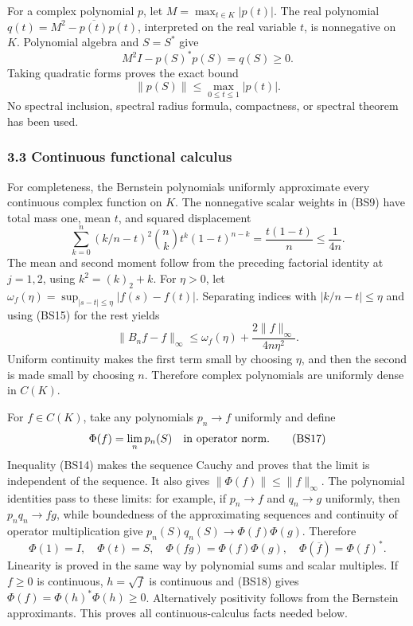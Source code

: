 \documentclass[
  11pt,
]{article}
\begin{document}
For a complex polynomial \(p\), let \(M=\max_{t\in K}|p(t)|\). The real
polynomial \(q(t)=M^2-\overline{p(t)}p(t)\), interpreted on the real
variable \(t\), is nonnegative on \(K\). Polynomial algebra and
\(S=S^*\) give \[
 M^2I-p(S)^*p(S)=q(S)\geq0.
\] Taking quadratic forms proves the exact bound \[
 \|p(S)\|\leq\max_{0\leq t\leq1}|p(t)|.
 \tag{BS14}
\] No spectral inclusion, spectral radius formula, compactness, or
spectral theorem has been used.

\subsubsection{3.3 Continuous functional
calculus}\label{continuous-functional-calculus}

For completeness, the Bernstein polynomials uniformly approximate every
continuous complex function on \(K\). The nonnegative scalar weights in
(BS9) have total mass one, mean \(t\), and squared displacement \[
 \sum_{k=0}^n(k/n-t)^2\binom nk t^k(1-t)^{n-k}
 =\frac{t(1-t)}n\leq\frac1{4n}.
 \tag{BS15}
\] The mean and second moment follow from the preceding factorial
identity at \(j=1,2\), using \(k^2=(k)_2+k\). For \(\eta>0\), let
\(\omega_f(\eta)=\sup_{|s-t|\leq\eta}|f(s)-f(t)|\). Separating indices
with \(|k/n-t|\leq\eta\) and using (BS15) for the rest yields \[
 \|B_nf-f\|_\infty
 \leq\omega_f(\eta)+\frac{2\|f\|_\infty}{4n\eta^2}.
 \tag{BS16}
\] Uniform continuity makes the first term small by choosing \(\eta\),
and then the second is made small by choosing \(n\). Therefore complex
polynomials are uniformly dense in \(C(K)\).

For \(f\in C(K)\), take any polynomials \(p_n\to f\) uniformly and
define \[
 \Phi(f)=\lim_n p_n(S)
 \quad\hbox{in operator norm}.
 \tag{BS17}
\] Inequality (BS14) makes the sequence Cauchy and proves that the limit
is independent of the sequence. It also gives
\(\|\Phi(f)\|\leq\|f\|_\infty\). The polynomial identities pass to these
limits: for example, if \(p_n\to f\) and \(q_n\to g\) uniformly, then
\(p_nq_n\to fg\), while boundedness of the approximating sequences and
continuity of operator multiplication give
\(p_n(S)q_n(S)\to\Phi(f)\Phi(g)\). Therefore \[
 \Phi(1)=I,\quad\Phi(t)=S,\quad
 \Phi(fg)=\Phi(f)\Phi(g),\quad
 \Phi(\overline f)=\Phi(f)^*.
 \tag{BS18}
\] Linearity is proved in the same way by polynomial sums and scalar
multiples. If \(f\geq0\) is continuous, \(h=\sqrt f\) is continuous and
(BS18) gives \(\Phi(f)=\Phi(h)^*\Phi(h)\geq0\). Alternatively positivity
follows from the Bernstein approximants. This proves all
continuous-calculus facts needed below.
\end{document}
